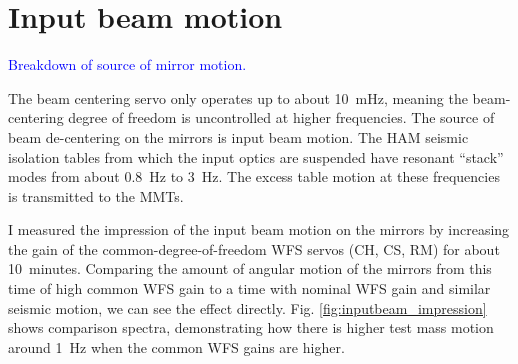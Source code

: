 \section{Input beam motion}
\textcolor{blue}{Breakdown of source of mirror motion.}

The beam centering servo only operates up to about 10~mHz, meaning the
beam-centering degree of freedom is uncontrolled at higher
frequencies. The source of beam de-centering on the mirrors is input
beam motion. The HAM seismic isolation tables from which the input
optics are suspended have resonant ``stack'' modes from about 0.8~Hz
to 3~Hz. The excess table motion at these frequencies is transmitted
to the MMTs. 

I measured the impression of the input beam motion on the mirrors by
increasing the gain of the common-degree-of-freedom WFS servos (CH,
CS, RM) for about 10~minutes. Comparing the amount of angular
motion of the mirrors from this time of high common WFS gain to a time
with nominal WFS gain and similar seismic motion, we can see the
effect directly. Fig. \ref{fig:inputbeam_impression} shows comparison
spectra, demonstrating how there is higher test mass motion around
1~Hz when the common WFS gains are higher.

